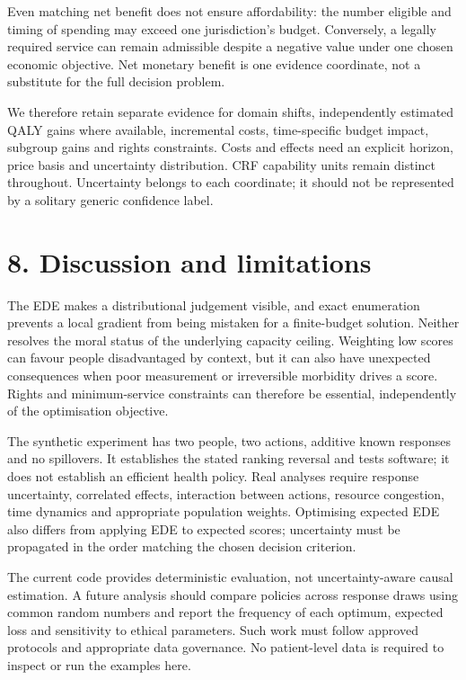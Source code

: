\documentclass[11pt,a4paper]{article}
\begin{document}
Even matching net benefit does not ensure affordability: the number eligible and timing of spending may exceed one jurisdiction's budget. Conversely, a legally required service can remain admissible despite a negative value under one chosen economic objective. Net monetary benefit is one evidence coordinate, not a substitute for the full decision problem.

We therefore retain separate evidence for domain shifts, independently estimated QALY gains where available, incremental costs, time-specific budget impact, subgroup gains and rights constraints. Costs and effects need an explicit horizon, price basis and uncertainty distribution. CRF capability units remain distinct throughout. Uncertainty belongs to each coordinate; it should not be represented by a solitary generic confidence label.

\section*{8. Discussion and limitations}
The EDE makes a distributional judgement visible, and exact enumeration prevents a local gradient from being mistaken for a finite-budget solution. Neither resolves the moral status of the underlying capacity ceiling. Weighting low scores can favour people disadvantaged by context, but it can also have unexpected consequences when poor measurement or irreversible morbidity drives a score. Rights and minimum-service constraints can therefore be essential, independently of the optimisation objective.

The synthetic experiment has two people, two actions, additive known responses and no spillovers. It establishes the stated ranking reversal and tests software; it does not establish an efficient health policy. Real analyses require response uncertainty, correlated effects, interaction between actions, resource congestion, time dynamics and appropriate population weights. Optimising expected EDE also differs from applying EDE to expected scores; uncertainty must be propagated in the order matching the chosen decision criterion.

The current code provides deterministic evaluation, not uncertainty-aware causal estimation. A future analysis should compare policies across response draws using common random numbers and report the frequency of each optimum, expected loss and sensitivity to ethical parameters. Such work must follow approved protocols and appropriate data governance. No patient-level data is required to inspect or run the examples here.
\end{document}
